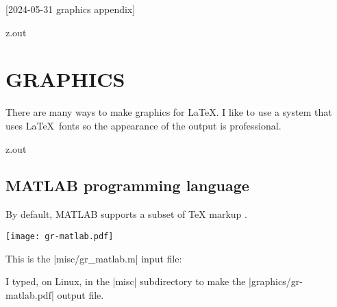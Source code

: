[2024-05-31 graphics appendix]

\begin{VerbatimOut}{z.out}
\chapter{GRAPHICS}

There are many ways to make graphics for \LaTeX.
I like to use a system that uses \LaTeX\ fonts
so the appearance of the output is professional.
\end{VerbatimOut}

\MyIO


\begin{VerbatimOut}{z.out}

\section{MATLAB programming language}

\def\gray#1{\colorbox{gray!15}{#1}}
\def\lightred#1{\colorbox{red!15}{#1}}
\def\lightgreen#1{\colorbox{green!20}{#1}}
\lightgreen{%
  By default,
  MATLAB supports a subset of TeX markup
  \cite{mathworks-help-center-text-properties}.
}

\texttt{[image: gr-matlab.pdf]}

This is the |misc/gr_matlab.m| input file:

I typed, on Linux,
in the |misc| subdirectory
to make the |graphics/gr-matlab.pdf| output file.
\end{VerbatimOut}

\MyIO


